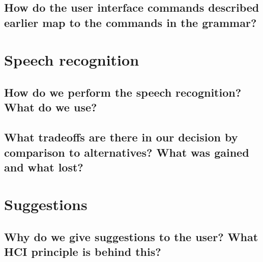 \documentclass[]{article}
\begin{document}
\subsection{How do the user interface commands described earlier map to the commands in the grammar?  }

\section{Speech recognition}

\subsection{How do we perform the speech recognition? What do we use?}

\subsection{What tradeoffs are there in our decision by comparison to alternatives? What was gained and what lost?}

\clearpage

\section{Suggestions}

\subsection{Why do we give suggestions to the user? What HCI principle is behind this?}
\end{document}
